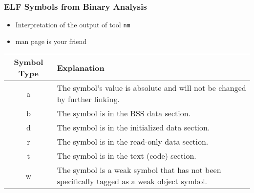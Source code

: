 \begin{frame}
\frametitle{ELF Symbols from Binary Analysis}

\begin{itemize}
    \item Interpretation of the output of tool \tt{nm}
    \item man page is your friend
\end{itemize}

\begin{tabular}{|c|p{}|}
\hline
\textbf{Symbol Type} & \textbf{Explanation} \\ \hline
a & The symbol's value is absolute and will not be changed by further linking. \\ \hline
b & The symbol is in the BSS data section. \\ \hline
d & The symbol is in the initialized data section. \\ \hline
r & The symbol is in the read-only data section. \\ \hline
t & The symbol is in the text (code) section. \\ \hline
w & The symbol is a weak symbol that has not been specifically tagged as a weak object symbol. \\ \hline
\end{tabular}

\end{frame}
